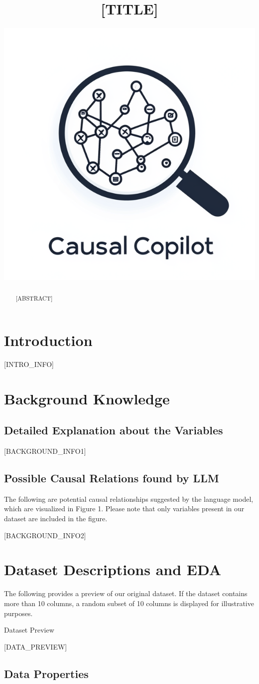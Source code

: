 \documentclass{article}
\title{[TITLE]}
\author{ \href{https://orcid.org/0000-0000-0000-0000}{\includegraphics[scale=0.06]{asset/logo.png}} }
\begin{document}
\maketitle

\begin{abstract}
[ABSTRACT]
\end{abstract}


\raggedbottom
\section{Introduction}
[INTRO_INFO]

\section{Background Knowledge}
\subsection{Detailed Explanation about the Variables}
[BACKGROUND_INFO1]

\subsection{Possible Causal Relations found by LLM}

The following are potential causal relationships suggested by the language model, which are visualized in Figure 1. Please note that only variables present in our dataset are included in the figure.

[BACKGROUND_INFO2]

\section{Dataset Descriptions and EDA}
The following provides a preview of our original dataset. If the dataset contains more than 10 columns, a random subset of 10 columns is displayed for illustrative purposes.

\begin{table}[H]
    \centering
    \caption{Dataset Preview}
    [DATA_PREVIEW]
\end{table}

\subsection{Data Properties}
\end{document}
